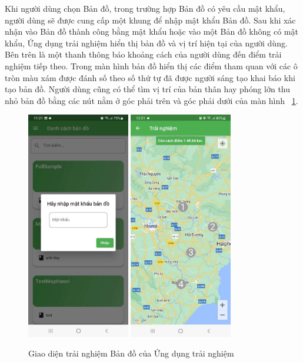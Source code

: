 Khi người dùng chọn Bản đồ, trong trường hợp Bản đồ có yêu cầu mật khẩu, người
dùng sẽ được cung cấp một khung để nhập mật khẩu Bản đồ. Sau khi xác nhận vào Bản đồ
thành công bằng mật khẩu hoặc vào một Bản đồ không có mật khẩu, Ứng dụng trải
nghiệm hiển thị bản đồ và vị trí hiện tại của người dùng. Bên trên là một thanh thông
báo khoảng cách của người dùng đến điểm trải nghiệm tiếp theo. Trong màn hình bản
đồ hiển thị các điểm tham quan với các ô tròn màu xám được đánh số theo số thứ tự
đã được người sáng tạo khai báo khi tạo bản đồ. Người dùng cũng có thể tìm vị trí của bản thân hay phóng lớn thu nhỏ bản đồ bằng các nút nằm ở góc phải trên và góc
phải dưới của màn hình \figurename~\ref{fig:player-in-map}.
\begin{figure}[h]
    \centering
    \includegraphics[width=0.4\textwidth]{figures/player-in-map-1.jpg}
    \includegraphics[width=0.4\textwidth]{figures/player-in-map-2.jpg}
    \caption{Giao diện trải nghiệm Bản đồ của Ứng dụng trải nghiệm}
    \label{fig:player-in-map}
\end{figure}

